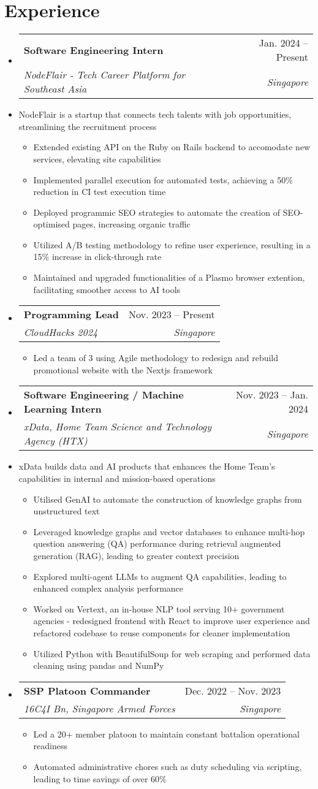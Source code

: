\documentclass[letterpaper,11pt]{article}
\makeatletter
\newcommand{\resumeItem}[1]{
  \item\small{
    {#1 \vspace{-2pt}}
  }
}
\newcommand{\resumeDescription}[1]{
  \item\small{
    {#1 \vspace{-7pt}}
  }
}
\newcommand{\resumeSubheading}[4]{
  \vspace{-2pt}\item
    \begin{tabular*}{0.97\textwidth}[t]{l@{\extracolsep{\fill}}r}
      \textbf{#1} & #2 \\
      \textit{\small#3} & \textit{\small #4} \\
    \end{tabular*}\vspace{-7pt}
}
\newcommand{\resumeSubHeadingListStart}{\begin{itemize}[leftmargin=0.15in, label={}]}
\newcommand{\resumeSubHeadingListEnd}{\end{itemize}}
\newcommand{\resumeItemListStart}{\begin{itemize}}
\newcommand{\resumeItemListEnd}{\end{itemize}\vspace{-5pt}}
\makeatother
\begin{document}
\section{Experience}
  \resumeSubHeadingListStart
    \resumeSubheading
      {Software Engineering Intern}{Jan. 2024 -- Present}
      {NodeFlair - Tech Career Platform for Southeast Asia}{Singapore}
      \resumeDescription{NodeFlair is a startup that connects tech talents with job opportunities, streamlining the recruitment process}
      \resumeItemListStart
        \resumeItem{Extended existing API on the Ruby on Rails backend to accomodate new services, elevating site capabilities}
        \resumeItem{Implemented parallel execution for automated tests, achieving a 50\% reduction in CI test execution time}
        \resumeItem{Deployed programmic SEO strategies to automate the creation of SEO-optimised pages, increasing organic traffic}
        \resumeItem{Utilized A/B testing methodology to refine user experience, resulting in a 15\% increase in click-through rate}
        \resumeItem{Maintained and upgraded functionalities of a Plasmo browser extention, facilitating smoother access to AI tools}
      \resumeItemListEnd
    \resumeSubheading
      {Programming Lead}{Nov. 2023 -- Present}
      {CloudHacks 2024}{Singapore}
      \resumeItemListStart
        \resumeItem{Led a team of 3 using Agile methodology to redesign and rebuild promotional website with the Nextjs framework}
      \resumeItemListEnd
    \resumeSubheading
      {Software Engineering / Machine Learning Intern}{Nov. 2023 -- Jan. 2024}
      {xData, Home Team Science and Technology Agency (HTX)}{Singapore}
      \resumeDescription{xData builds data and AI products that enhances the Home Team's capabilities in internal and mission-based operations}
      \resumeItemListStart
        \resumeItem{Utilised GenAI to automate the construction of knowledge graphs from unstructured text}
        \resumeItem{Leveraged knowledge graphs and vector databases to enhance multi-hop question answering (QA) performance during retrieval augmented generation (RAG), leading to greater context precision}
        \resumeItem{Explored multi-agent LLMs to augment QA capabilities, leading to enhanced complex analysis performance}
        \resumeItem{Worked on Vertext, an in-house NLP tool serving 10+ government agencies - redesigned frontend with React to improve user experience and refactored codebase to reuse components for cleaner implementation}
        \resumeItem{Utilized Python with BeautifulSoup for web scraping and performed data cleaning using pandas and NumPy}
      \resumeItemListEnd
    \resumeSubheading
      {SSP Platoon Commander}{Dec. 2022 -- Nov. 2023}
      {16C4I Bn, Singapore Armed Forces}{Singapore}
      \resumeItemListStart
        \resumeItem{Led a 20+ member platoon to maintain constant battalion operational readiness}
        \resumeItem{Automated administrative chores such as duty scheduling via scripting, leading to time savings of over 60\%}
      \resumeItemListEnd
  \resumeSubHeadingListEnd
\end{document}
